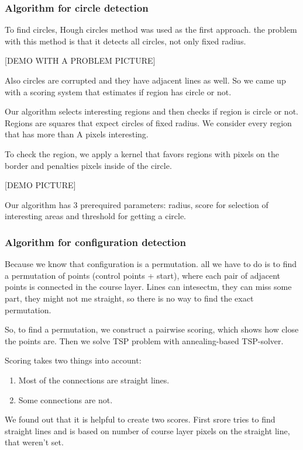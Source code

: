 \documentclass[a4paper,12pt]{extarticle}
\begin{document}
\subsubsection{Algorithm for circle detection}

To find circles, Hough circles method was used as the first approach. the problem with this method is that it detects all circles, not only fixed radius. 

[DEMO WITH A PROBLEM PICTURE]

Also circles are corrupted and they have adjacent lines as well. So we came up with a scoring system that estimates if region has circle or not.

Our algorithm selects interesting regions and then checks if region is circle or not. Regions are squares that expect circles of fixed radius. We consider every region that has more than A pixels interesting.

To check the region, we apply a kernel that favors regions with pixels on the border and penalties pixels inside of the circle.

[DEMO PICTURE]

Our algorithm has 3 prerequired parameters: radius, score for selection of interesting areas and threshold for getting a circle.


\subsubsection{Algorithm for configuration detection}

Because we know that configuration is a permutation. all we have to do is to find a permutation of points (control points + start), where each pair of adjacent points is connected in the course layer.
Lines can intesectm, they can miss some part, they might not me straight, so there is no way to find the exact permutation.

So, to find a permutation, we construct a pairwise scoring, which shows how close the points are.
Then we solve TSP problem with annealing-based TSP-solver.

Scoring takes two things into account:
\begin{enumerate}
    \item Most of the connections are straight lines.
    \item Some connections are not.
\end{enumerate}

We found out that it is helpful to create two scores.
First srore tries to find straight lines and is based on number of course layer pixels on the straight line, that weren't set.
\end{document}
